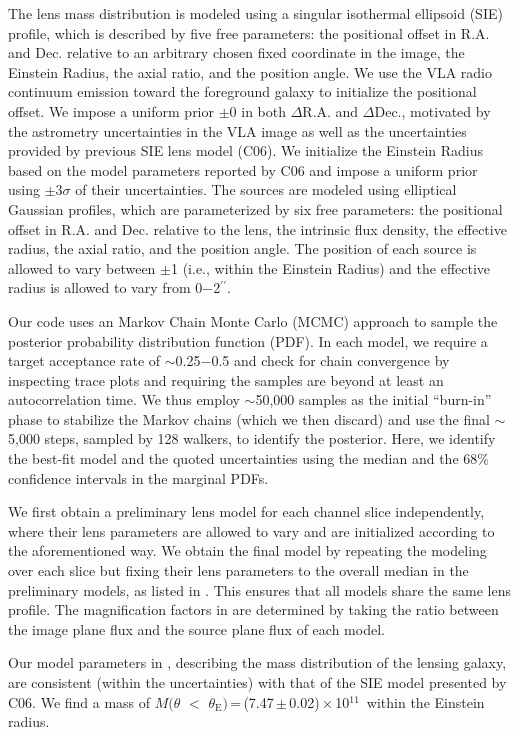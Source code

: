 \documentclass[]{emulateapj}
\begin{document}
The lens mass distribution is modeled using a singular isothermal
ellipsoid (SIE) profile, which is described by five free parameters: the
positional offset in R.A. and Dec. relative to an arbitrary chosen
fixed coordinate in the image, the Einstein Radius, the axial ratio, and the
position angle. We use the VLA radio continuum emission toward
the foreground galaxy to initialize the positional offset. We impose a
uniform prior $\pm$0 in both $\Delta$R.A. and $\Delta$Dec.,
motivated by the astrometry uncertainties in the VLA image as well as
the uncertainties provided by previous SIE lens model (C06).
We initialize the Einstein Radius based on the model parameters reported by C06
and impose a uniform prior using $\pm$3$\sigma$ of their uncertainties.
The sources are modeled using elliptical Gaussian profiles, which are
parameterized by six free parameters: the positional offset in R.A.
and Dec. relative to the lens, the intrinsic flux density, the effective
radius, the axial ratio, and the position angle. The position of each source
is allowed to vary between $\pm$1 (i.e., within the Einstein Radius)
and the effective radius is allowed to vary from 0$-$2$^{\prime\prime}$.

Our code uses an Markov Chain Monte Carlo (MCMC) approach to sample the
posterior probability distribution function (PDF).
In each model, we require a target acceptance rate of $\sim$0.25$-$0.5
and check for chain convergence by inspecting trace plots
and requiring the samples are beyond at least an autocorrelation time.
We thus employ $\sim$50,000 samples as the initial ``burn-in'' phase
to stabilize the Markov chains (which we then discard) and
use the final $\sim$5,000 steps, sampled by 128 walkers, to identify
the posterior. Here, we
identify the best-fit model and the quoted uncertainties using the
median and the 68\% confidence intervals in the marginal PDFs.


We first obtain a preliminary lens model for each channel slice independently,
where their lens parameters are allowed to vary and are initialized according
to the aforementioned way. We obtain the final model
by repeating the modeling over each slice but fixing their lens parameters
to the overall median in the preliminary models,
as listed in .
This ensures that all models share the same lens profile.
The magnification factors in  are determined by taking the ratio
between the image plane flux and the source plane flux of each model.

Our model parameters in , describing
the mass distribution of the lensing galaxy, are consistent (within the uncertainties)
with that of the SIE model presented by C06. We find a mass of
$M(\theta$\,\,$<$\,\,$\theta_\textrm{E})$\,=\,(7.47\,$\pm$\,0.02)\,$\times$\,10$^{11}$\,\Msun
within the Einstein radius.
\end{document}
